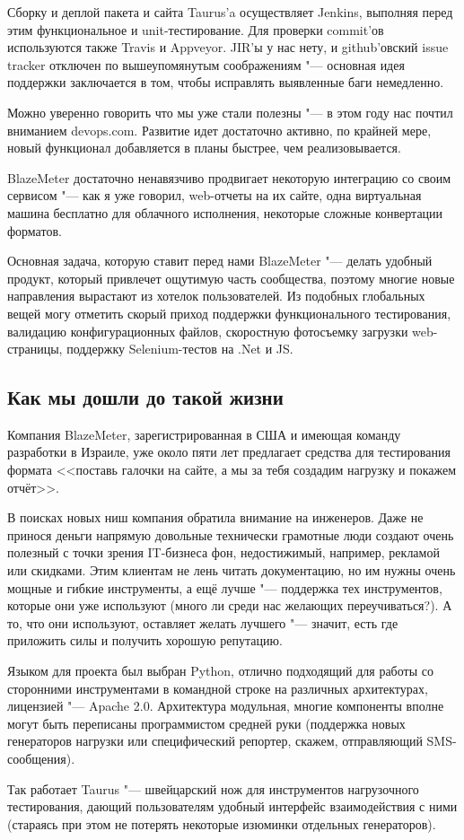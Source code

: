 \documentclass[10pt, a5paper]{article}
\begin{document}
Сборку и деплой пакета и сайта Taurus’a осуществляет Jenkins, выполняя перед этим функциональное и unit-тестирование. Для проверки commit’ов используются также Travis и Appveyor. JIR’ы у нас нету, и github’овский issue tracker отключен по вышеупомянутым соображениям "--- основная идея поддержки заключается в том, чтобы исправлять выявленные баги немедленно.

Можно уверенно говорить что мы уже стали полезны "--- в этом году нас почтил вниманием devops.com. Развитие идет достаточно активно, по крайней мере, новый функционал добавляется в планы быстрее, чем реализовывается.

BlazeMeter достаточно ненавязчиво продвигает некоторую интеграцию со своим сервисом "--- как я уже говорил, web-отчеты на их сайте, одна виртуальная машина бесплатно для облачного исполнения, некоторые сложные конвертации форматов.

Основная задача, которую ставит перед нами BlazeMeter "--- делать удобный продукт, который привлечет ощутимую часть сообщества, поэтому многие новые направления вырастают из хотелок пользователей. Из подобных глобальных вещей могу отметить скорый приход поддержки функционального тестирования, валидацию конфигурационных файлов, скоростную фотосъемку загрузки web-страницы, поддержку Selenium-тестов на .Net и JS.

\subsection*{Как мы дошли до такой жизни}

Компания BlazeMeter, зарегистрированная в США и имеющая команду разработки в Израиле, уже около пяти лет предлагает средства для тестирования формата <<поставь галочки на сайте, а мы за тебя создадим нагрузку и покажем отчёт>>.

В поисках новых ниш компания обратила внимание на инженеров. Даже не принося деньги напрямую довольные технически грамотные люди создают очень полезный с точки зрения IT-бизнеса фон, недостижимый, например, рекламой или скидками. Этим клиентам не лень читать документацию, но им нужны очень мощные и гибкие инструменты, а ещё лучше "--- поддержка тех инструментов, которые они уже используют (много ли среди нас желающих переучиваться?). А то, что они используют, оставляет желать лучшего "--- значит, есть где приложить силы и получить хорошую репутацию.

Языком для проекта был выбран Python, отлично подходящий для работы со сторонними инструментами в командной строке на различных архитектурах, лицензией "--- Apache 2.0. Архитектура модульная, многие компоненты вполне могут быть переписаны программистом средней руки (поддержка новых генераторов нагрузки или специфический репортер, скажем, отправляющий \linebreak SMS-сообщения).

Так работает Taurus "--- швейцарский нож для инструментов нагрузочного тестирования, дающий пользователям удобный интерфейс взаимодействия с ними (стараясь при этом не потерять некоторые изюминки отдельных генераторов).
\end{document}
